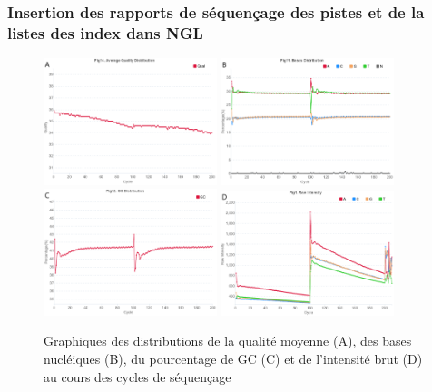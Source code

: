 \subsubsection*{Insertion des rapports de séquençage des pistes et de la listes des index dans NGL}
\begin{figure}[H]
    \centering
    \includegraphics[width=0.45\textwidth]{img/mean_quality.png}
    \includegraphics[width=0.45\textwidth]{img/bases_content.png}\\
    \includegraphics[width=0.45\textwidth]{img/GC_content.png}
    \includegraphics[width=0.45\textwidth]{img/raw_intensity.png}
    \caption{\footnotesize{Graphiques des distributions de la qualité moyenne (A), des bases nucléiques (B), du pourcentage de GC (C) et de l'intensité brut (D) au cours des cycles de séquençage}}
    \label{Graph-rapport-pistes}
\end{figure}

